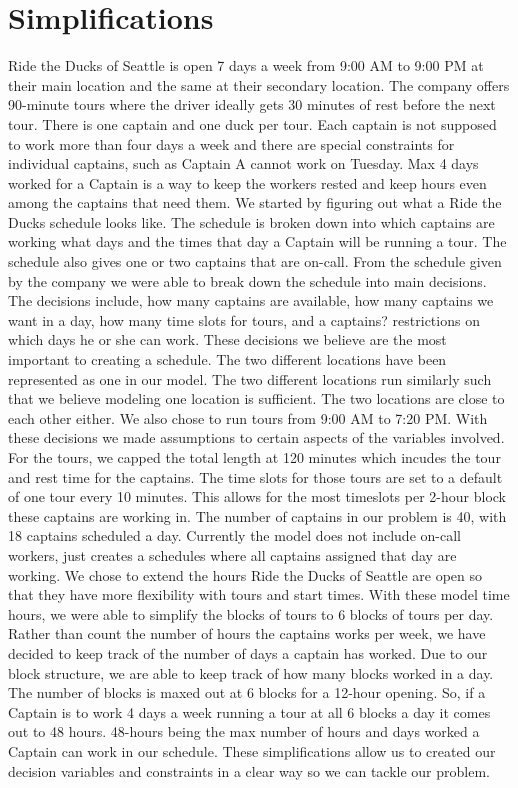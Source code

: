 \documentclass[12pt]{article}
\begin{document}
\section*{Simplifications}
Ride the Ducks of Seattle is open 7 days a week from 9:00 AM to 9:00 PM at their main location and the same at their secondary location.  The company offers 90-minute tours where the driver ideally gets 30 minutes of rest before the next tour. There is one captain and one duck per tour. Each captain is not supposed to work more than four days a week and there are special constraints for individual captains, such as Captain A cannot work on Tuesday. Max 4 days worked for a Captain is a way to keep the workers rested and keep hours even among the captains that need them. We started by figuring out what a Ride the Ducks schedule looks like. The schedule is broken down into which captains are working what days and the times that day a Captain will be running a tour. The schedule also gives one or two captains that are on-call. From the schedule given by the company we were able to break down the schedule into main decisions. The decisions include, how many captains are available, how many captains we want in a day, how many time slots for tours, and a captains? restrictions on which days he or she can work. These decisions we believe are the most important to creating a schedule. The two different locations have been represented as one in our model. The two different locations run similarly such that we believe modeling one location is sufficient. The two locations are close to each other either. We also chose to run tours from 9:00 AM to 7:20 PM. With these decisions we made assumptions to certain aspects of the variables involved. For the tours, we capped the total length at 120 minutes which incudes the tour and rest time for the captains. The time slots for those tours are set to a default of one tour every 10 minutes. This allows for the most timeslots per 2-hour block these captains are working in. The number of captains in our problem is 40, with 18 captains scheduled a day. Currently the model does not include on-call workers, just creates a schedules where all captains assigned that day are working. We chose to extend the hours Ride the Ducks of Seattle are open so that they have more flexibility with tours and start times. With these model time hours, we were able to simplify the blocks of tours to 6 blocks of tours per day. Rather than count the number of hours the captains works per week, we have decided to keep track of the number of days a captain has worked. Due to our block structure, we are able to keep track of how many blocks worked in a day. The number of blocks is maxed out at 6 blocks for a 12-hour opening. So, if a Captain is to work 4 days a week running a tour at all 6 blocks a day it comes out to 48 hours. 48-hours being the max number of hours and days worked a Captain can work in our schedule.  These simplifications allow us to created our decision variables and constraints in a clear way so we can tackle our problem.
\end{document}
